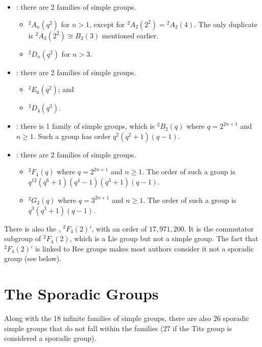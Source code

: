 \begin{itemize}
    \item {}: there are 2 families of simple groups.
    \begin{itemize}
        \item ${^2A_n(q^2)}$ for $n > 1$, except for ${^2A_2(2^2)} = {^2A_2(4)}$. The only duplicate is ${^2A_3(2^2)} \cong B_2(3)$ mentioned earlier.
        \item ${^2D_n(q^2)}$ for $n > 3$.
    \end{itemize}

    \item {}: there are 2 families of simple groups.
    \begin{itemize}
        \item ${^2E_6(q^2)}$; and
        \item ${^3D_4(q^3)}$.
    \end{itemize}

    \item {}: there is 1 family of simple groups, which is ${^2B_2(q)}$ where $q = 2^{2n+1}$ and $n \geq 1$. Such a group has order $q^2(q^2+1)(q-1)$.

    \item {}: there are 2 families of simple groups.
    \begin{itemize}
        \item $^2F_4(q)$ where $q = 2^{2n+1}$ and $n \geq 1$. The order of such a group is $q^{12}(q^6+1)(q^4-1)(q^3+1)(q-1)$.
        \item $^2G_2(q)$ where $q = 3^{2n+1}$ and $n \geq 1$. The order of such a group is $q^3(q^3+1)(q-1)$.
    \end{itemize}
\end{itemize}

There is also the , $^2F_4(2)'$, with an order of $17,971,200$. It is the commutator subgroup of $^2F_4(2)$, which is a Lie group but not a simple group. The fact that $^2F_4(2)'$ is linked to Ree groups makes most authors consider it not a sporadic group (see below).

\section{The Sporadic Groups}
Along with the 18 infinite families of simple groups, there are also 26 sporadic simple groups that do not fall within the families (27 if the Tits group is considered a sporadic group).

